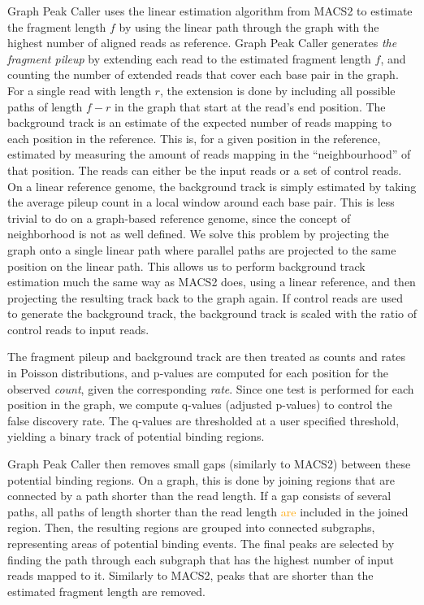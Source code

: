 \documentclass[10pt,letterpaper]{article}
\newcommand{\revision}[1]{\textcolor{orange}{#1}}
\begin{document}
Graph Peak Caller uses the linear estimation algorithm from MACS2 to estimate the fragment length $f$ by using the linear path through the graph with the highest number of aligned reads as reference.
Graph Peak Caller generates \emph{the fragment pileup} by extending each read to the estimated fragment length $f$, and counting the number of extended reads that cover each base pair in the graph. For a single read with length $r$, the extension is done by including all possible paths of length $f-r$ in the graph that start at the read’s end position. 
The background track is an estimate of the expected number of reads mapping to each position in the reference. This is, for a given position in the reference, estimated by measuring the amount of reads mapping in the “neighbourhood” of that position. The reads can either be the input reads or a set of control reads. On a linear reference genome, the background track is simply estimated by taking the average pileup count in a local window around each base pair. This is less trivial to do on a graph-based reference genome, since the concept of neighborhood is not as well defined. We solve this problem by projecting the graph onto a single linear path where parallel paths are projected to the same position on the linear path. This allows us to perform background track estimation much the same way as MACS2 does, using a linear reference, and then projecting the resulting track back to the graph again. If control reads are used to generate the background track, the background track is scaled with the ratio of control reads to input reads.
	
The fragment pileup and background track are then treated as counts and rates in Poisson distributions, and p-values are computed for each position for the observed \emph{count}, given the corresponding \emph{rate}. Since one test is performed for each position in the graph, we compute q-values (adjusted p-values) to control the false discovery rate. The q-values are thresholded at a user specified threshold, yielding a binary track of potential binding regions. 

Graph Peak Caller then removes small gaps (similarly to MACS2) between these potential binding regions.
On a graph, this is done by joining regions that are connected by a path shorter than the read length.
If a gap consists of several paths, all paths of length shorter than the read length \revision{are} included in the joined region.
Then, the resulting regions are grouped into connected subgraphs, representing areas of potential binding events. The final peaks are selected by finding the path through each subgraph that has the highest number of input reads mapped to it. Similarly to MACS2, peaks that are shorter than the estimated fragment length are removed. 
\end{document}
